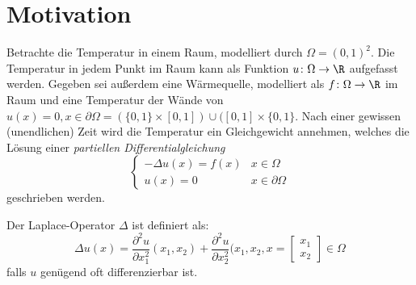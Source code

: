 \section{Motivation}
Betrachte die Temperatur in einem Raum, modelliert durch $\Omega = (0,1)^2$.
Die Temperatur in jedem Punkt im Raum kann als Funktion $u \colon \Omega \to \R $ aufgefasst werden.
Gegeben sei außerdem eine Wärmequelle, modelliert als $f \colon \Omega \to \R $  im Raum und eine Temperatur der Wände von $u(x)=0, x \in \partial \Omega = (\{0,1\} \times [0,1] ) \cup ([0,1] \times \{0,1\} $.
Nach einer gewissen (unendlichen) Zeit wird die Temperatur ein Gleichgewicht annehmen, welches die Lösung einer \emph{partiellen Differentialgleichung}
\begin{equation}
\begin{cases}
	-\Delta u(x) = f(x) & x \in \Omega \\
	u(x) = 0 & x \in \partial \Omega
\end{cases}
\end{equation}
geschrieben werden.
\begin{definition}
Der Laplace-Operator $\Delta$ ist definiert als: 
\[
\Delta u(x) = \frac{\partial^2 u}{\partial x_1^2}(x_1,x_2) + \frac{\partial^2 u}{\partial x_2^2}(x_1,x_2 , x = \begin{bmatrix}
x_1 \\ x_{2} 
\end{bmatrix} \in \Omega
\]
falls $u$ genügend oft differenzierbar ist.
\end{definition}

